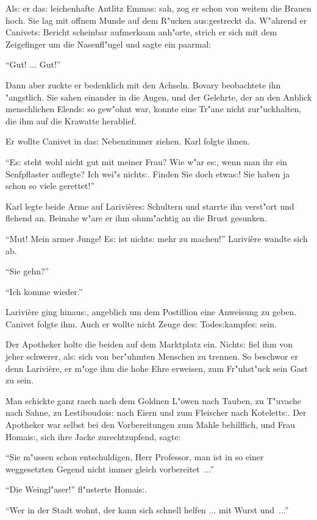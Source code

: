 \documentclass[oneside,12pt]{book}
\newcommand{\s}{s:}%
\begin{document}
Al{\s} er da{\s} leichenhafte Antlitz Emma{\s} sah, zog er schon
von weitem die Brauen hoch. Sie lag mit offnem Munde auf dem
R"ucken au{\s}gestreckt da. W"ahrend er Canivet{\s} Bericht
scheinbar aufmerksam anh"orte, strich er sich mit dem Zeigefinger
um die Nasenfl"ugel und sagte ein paarmal:

"`Gut! ... Gut!"'

Dann aber zuckte er bedenklich mit den Achseln. Bovary beobachtete
ihn "angstlich. Sie sahen einander in die Augen, und der Gelehrte,
der an den Anblick menschlichen Elend{\s} so gew"ohnt war, konnte
eine Tr"ane nicht zur"uckhalten, die ihm auf die Krawatte
herablief.

Er wollte Canivet in da{\s} Nebenzimmer ziehen. Karl folgte ihnen.

"`E{\s} steht wohl nicht gut mit meiner Frau? Wie w"ar e{\s}, wenn
man ihr ein Senfpflaster auflegte? Ich wei"s nicht{\s}. Finden Sie
doch etwa{\s}! Sie haben ja schon so viele gerettet!"'

Karl legte beide Arme auf Larivi\`ere{\s} Schultern und starrte
ihn verst"ort und flehend an. Beinahe w"are er ihm ohnm"achtig an
die Brust gesunken.

"`Mut! Mein armer Junge! E{\s} ist nicht{\s} mehr zu machen!"'
Larivi\`ere wandte sich ab.

"`Sie gehn?"'

"`Ich komme wieder."'

Larivi\`ere ging hinau{\s}, angeblich um dem Postillion eine
Anweisung zu geben. Canivet folgte ihm. Auch er wollte nicht Zeuge
de{\s} Tode{\s}kampfe{\s} sein.

Der Apotheker holte die beiden auf dem Marktplatz ein. Nicht{\s}
fiel ihm von jeher schwerer, al{\s} sich von ber"uhmten Menschen
zu trennen. So beschwor er denn Larivi\`ere, er m"oge ihm die hohe
Ehre erweisen, zum Fr"uhst"uck sein Gast zu sein.

Man schickte ganz rasch nach dem Goldnen L"owen nach Tauben, zu
T"uvache nach Sahne, zu Lestiboudoi{\s} nach Eiern und zum
Fleischer nach Kotelett{\s}. Der Apotheker war selbst bei den
Vorbereitungen zum Mahle behilflich, und Frau Homai{\s}, sich ihre
Jacke zurechtzupfend, sagte:

"`Sie m"ussen schon entschuldigen, Herr Professor, man ist in so
einer weggesetzten Gegend nicht immer gleich vorbereitet~..."'

"`Die Weingl"aser!"' fl"usterte Homai{\s}.

"`Wer in der Stadt wohnt, der kann sich schnell helfen ... mit
Wurst und~..."'
\end{document}
